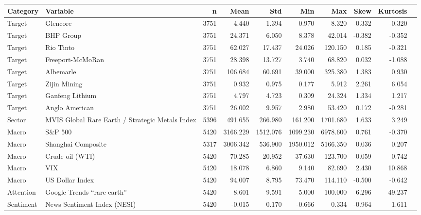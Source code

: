 \begin{tabular}{llrrrrrrrr}
\toprule
Category & Variable & n & Mean & Std & Min & Max & Skew & Kurtosis \\
\midrule
Target & Glencore & 3751 & 4.440 & 1.394 & 0.970 & 8.320 & -0.332 & -0.320 \\
Target & BHP Group & 3751 & 24.371 & 6.050 & 8.378 & 42.014 & -0.382 & -0.352 \\
Target & Rio Tinto & 3751 & 62.027 & 17.437 & 24.026 & 120.150 & 0.185 & -0.321 \\
Target & Freeport-McMoRan & 3751 & 28.398 & 13.727 & 3.740 & 68.820 & 0.032 & -1.088 \\
Target & Albemarle & 3751 & 106.684 & 60.691 & 39.000 & 325.380 & 1.383 & 0.930 \\
Target & Zijin Mining & 3751 & 0.932 & 0.975 & 0.177 & 5.912 & 2.261 & 6.054 \\
Target & Ganfeng Lithium & 3751 & 4.797 & 4.723 & 0.309 & 24.324 & 1.334 & 1.217 \\
Target & Anglo American & 3751 & 26.002 & 9.957 & 2.980 & 53.420 & 0.172 & -0.281 \\
Sector & MVIS Global Rare Earth / Strategic Metals Index & 5396 & 491.655 & 266.980 & 161.200 & 1701.680 & 1.633 & 3.249 \\
Macro & S\&P 500 & 5420 & 3166.229 & 1512.076 & 1099.230 & 6978.600 & 0.761 & -0.370 \\
Macro & Shanghai Composite & 5317 & 3006.342 & 536.900 & 1950.012 & 5166.350 & 0.036 & 0.207 \\
Macro & Crude oil (WTI) & 5420 & 70.285 & 20.952 & -37.630 & 123.700 & 0.059 & -0.742 \\
Macro & VIX & 5420 & 18.078 & 6.860 & 9.140 & 82.690 & 2.430 & 10.868 \\
Macro & US Dollar Index & 5420 & 94.007 & 8.795 & 73.470 & 114.110 & -0.500 & -0.642 \\
Attention & Google Trends ``rare earth'' & 5420 & 8.601 & 9.591 & 5.000 & 100.000 & 6.296 & 49.237 \\
Sentiment & News Sentiment Index (NESI) & 5420 & -0.015 & 0.170 & -0.666 & 0.334 & -0.964 & 1.611 \\
\bottomrule
\end{tabular}
